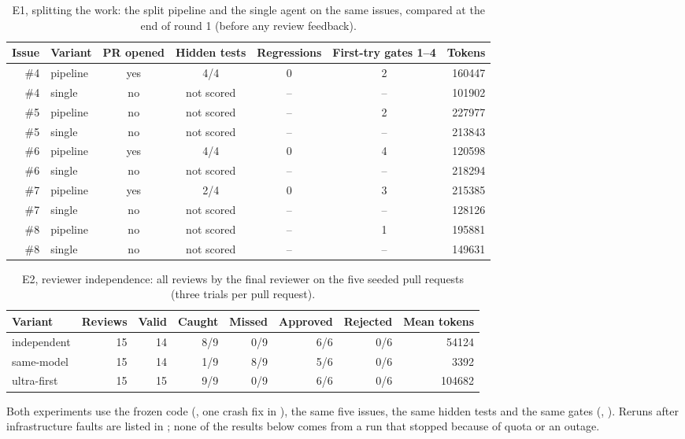 \begin{table}[ht]\centering\small
\caption{E1, splitting the work: the split pipeline and the single agent on the same issues, compared at the end of round 1 (before any review feedback).}\label{tab:e1}
\begin{tabular}{@{}r l c c c c r@{}}
\toprule
Issue & Variant & PR opened & Hidden tests & Regressions & First-try gates 1--4 & Tokens \\ \midrule
\#4 & pipeline & yes & 4/4 & 0 & 2 & 160447 \\
\#4 & single & no & not scored & -- & -- & 101902 \\
\#5 & pipeline & no & not scored & -- & 2 & 227977 \\
\#5 & single & no & not scored & -- & -- & 213843 \\
\#6 & pipeline & yes & 4/4 & 0 & 4 & 120598 \\
\#6 & single & no & not scored & -- & -- & 218294 \\
\#7 & pipeline & yes & 2/4 & 0 & 3 & 215385 \\
\#7 & single & no & not scored & -- & -- & 128126 \\
\#8 & pipeline & no & not scored & -- & 1 & 195881 \\
\#8 & single & no & not scored & -- & -- & 149631 \\
\bottomrule\end{tabular}
\end{table}
\begin{table}[ht]\centering\small
\caption{E2, reviewer independence: all reviews by the final reviewer on the five seeded pull requests (three trials per pull request).}\label{tab:e2}
\begin{tabular}{@{}l r r r r r r r@{}}
\toprule
Variant & Reviews & Valid & Caught & Missed & Approved & Rejected & Mean tokens \\ \midrule
independent & 15 & 14 & 8/9 & 0/9 & 6/6 & 0/6 & 54124 \\
same-model & 15 & 14 & 1/9 & 8/9 & 5/6 & 0/6 & 3392 \\
ultra-first & 15 & 15 & 9/9 & 0/9 & 6/6 & 0/6 & 104682 \\
\bottomrule\end{tabular}
\end{table}
Both experiments use the frozen code (, one crash fix in ), the same five issues, the same hidden tests and the same gates (, ). Reruns after infrastructure faults are listed in ; none of the results below comes from a run that stopped because of quota or an outage.

